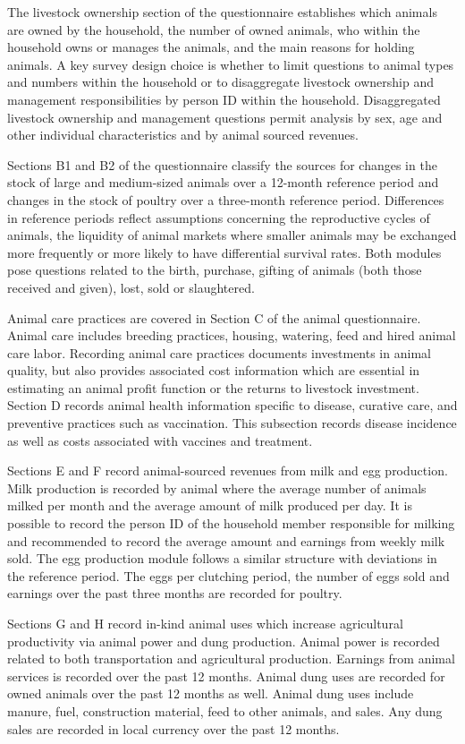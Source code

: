 \documentclass[
]{book}
\begin{document}
The livestock ownership section of the questionnaire establishes which animals are owned by the household, the number of owned animals, who within the household owns or manages the animals, and the main reasons for holding animals. A key survey design choice is whether to limit questions to animal types and numbers within the household or to disaggregate livestock ownership and management responsibilities by person ID within the household. Disaggregated livestock ownership and management questions permit analysis by sex, age and other individual characteristics and by animal sourced revenues.

Sections B1 and B2 of the questionnaire classify the sources for changes in the stock of large and medium-sized animals over a 12-month reference period and changes in the stock of poultry over a three-month reference period. Differences in reference periods reflect assumptions concerning the reproductive cycles of animals, the liquidity of animal markets where smaller animals may be exchanged more frequently or more likely to have differential survival rates. Both modules pose questions related to the birth, purchase, gifting of animals (both those received and given), lost, sold or slaughtered.

Animal care practices are covered in Section C of the animal questionnaire. Animal care includes breeding practices, housing, watering, feed and hired animal care labor. Recording animal care practices documents investments in animal quality, but also provides associated cost information which are essential in estimating an animal profit function or the returns to livestock investment. Section D records animal health information specific to disease, curative care, and preventive practices such as vaccination. This subsection records disease incidence as well as costs associated with vaccines and treatment.

Sections E and F record animal-sourced revenues from milk and egg production. Milk production is recorded by animal where the average number of animals milked per month and the average amount of milk produced per day. It is possible to record the person ID of the household member responsible for milking and recommended to record the average amount and earnings from weekly milk sold. The egg production module follows a similar structure with deviations in the reference period. The eggs per clutching period, the number of eggs sold and earnings over the past three months are recorded for poultry.

Sections G and H record in-kind animal uses which increase agricultural productivity via animal power and dung production. Animal power is recorded related to both transportation and agricultural production. Earnings from animal services is recorded over the past 12 months. Animal dung uses are recorded for owned animals over the past 12 months as well. Animal dung uses include manure, fuel, construction material, feed to other animals, and sales. Any dung sales are recorded in local currency over the past 12 months.
\end{document}
